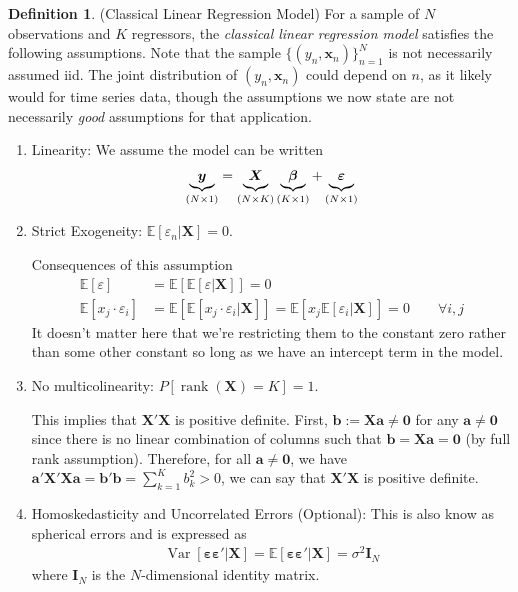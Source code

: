 \documentclass[12pt]{article}
\theoremstyle{plain}
\theoremstyle{definition}
\newtheorem{defn}[thm]{Definition}
\theoremstyle{remark}
\newcommand{\bsb}{\boldsymbol{b}}
\newcommand{\bsa}{\boldsymbol{a}}
\newcommand{\bsx}{\boldsymbol{x}}
\newcommand{\bsI}{\boldsymbol{I}}
\newcommand{\bsX}{\boldsymbol{X}}
\newcommand{\bsy}{\boldsymbol{y}}
\newcommand{\bso}{\boldsymbol{0}}
\newcommand{\bsvarepsilon}{\boldsymbol{\varepsilon}}
\newcommand{\bsbeta}{\boldsymbol{\beta}}
\newcommand{\E}{\mathbb{E}}
\newcommand{\rank}{\operatorname{rank}}
\newcommand{\Var}{\operatorname{Var}}
\newcommand{\nN}{_{n=1}^N}
\begin{document}
\begin{defn}(Classical Linear Regression Model)
For a sample of $N$ observations and $K$ regressors, the
\emph{classical linear regression model} satisfies the following
assumptions. Note that the sample $\{(y_n,\bsx_n)\}\nN$ is not
necessarily assumed iid. The joint distribution of $(y_n,\bsx_n)$ could
depend on $n$, as it likely would for time series data, though the
assumptions we now state are not necessarily \emph{good} assumptions for
that application.
\begin{enumerate}
  \item Linearity: We assume the model can be written
    \begin{align}
      \underbrace{\bsy}_{(N\times 1)}
      =
      \underbrace{\vphantom{\bsy} \bsX}_{(N\times K)}
      \underbrace{\vphantom{\bsy} \bsbeta}_{(K\times 1)}
      + \underbrace{\vphantom{\bsy} \bsvarepsilon}_{(N\times 1)}
      \label{regyx}
    \end{align}
  \item Strict Exogeneity: $\E[\varepsilon_n |\bsX]=0$.

    Consequences of this assumption
    \begin{align*}
      \E[\varepsilon] &= \E[\E[\varepsilon|\bsX]] = 0 \\
      \E[x_j \cdot \varepsilon_i] &=
      \E[\E[x_j \cdot \varepsilon_i|\bsX]] =
      \E[x_j\E[ \varepsilon_i|\bsX]] = 0
      \qquad \forall i,j
    \end{align*}
    It doesn't matter here that we're restricting them to the constant
    zero rather than some other constant so long as we have an intercept
    term in the model.

  \item No multicolinearity: $P[\rank(\bsX)=K]=1$.

    This implies that $\bsX'\bsX$ is positive definite. First,
    $\bsb:=\bsX \bsa\neq \bso$ for any $\bsa\neq \bso$ since there is no
    linear combination of columns such that $\bsb=\bsX\bsa = \bso$ (by
    full rank assumption). Therefore, for all $\bsa\neq \bso$, we have
    $\bsa'\bsX'\bsX\bsa=\bsb'\bsb = \sum_{k=1}^K b_k^2 > 0$, we can say
    that $\bsX'\bsX$ is positive definite.

  \item Homoskedasticity and Uncorrelated Errors (Optional): This is
    also know as spherical errors and is expressed as
    \begin{align*}
      \Var[\bsvarepsilon\bsvarepsilon'|\bsX] =
      \E[\bsvarepsilon\bsvarepsilon'|\bsX] = \sigma^2\bsI_N
    \end{align*}
    where $\bsI_N$ is the $N$-dimensional identity matrix.
\end{enumerate}
\end{defn}
\end{document}
